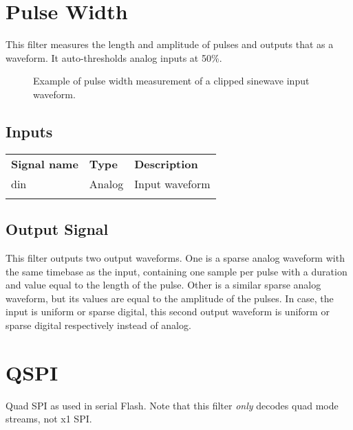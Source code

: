 \section{Pulse Width}
\label{filter:pulsewidth}

This filter measures the length and amplitude of pulses and outputs that as a waveform. It auto-thresholds analog inputs at 50\%.

\begin{figure}[h]
\centering
{}
\caption{Example of pulse width measurement of a clipped sinewave input waveform.}
\label{filter_pulsewidth}
\end{figure}

\subsection{Inputs}

\begin{tabularx}{16cm}{llX}
\thickhline
\textbf{Signal name} & \textbf{Type} & \textbf{Description} \\
\thickhline
din & Analog & Input waveform \\
\thickhline
\end{tabularx}

\subsection{Output Signal}

This filter outputs two output waveforms. One is a sparse analog waveform with the same timebase as the input, containing one sample per pulse with
a duration and value equal to the length of the pulse. Other is a similar sparse analog waveform, but its values are equal to the amplitude of the pulses. In case,
the input is uniform or sparse digital, this second output waveform is uniform or sparse digital respectively instead of analog.

\pagebreak
\section{QSPI}

Quad SPI as used in serial Flash. Note that this filter \emph{only} decodes quad mode streams, not x1 SPI.

\pagebreak
